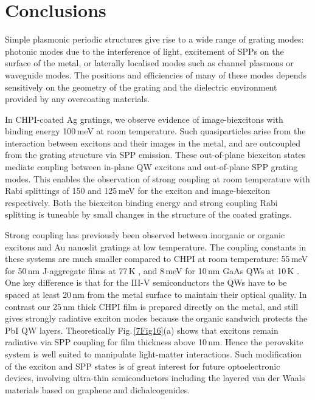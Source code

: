 \section{Conclusions}
Simple plasmonic periodic structures give rise to a wide range of grating modes: photonic modes due to the interference of light, excitement of SPPs on the surface of the metal, or laterally localised modes such as channel plasmons or waveguide modes. The positions and efficiencies of many of these modes depends sensitively on the geometry of the grating and the dielectric environment provided by any overcoating materials.

In CHPI-coated Ag gratings, we observe evidence of image-biexcitons with binding energy 100\,meV at room temperature. Such quasiparticles arise from the interaction between excitons and their images in the metal, and are outcoupled from the grating structure via SPP emission. These out-of-plane biexciton states mediate coupling between in-plane QW excitons and out-of-plane SPP grating modes. This enables the observation of strong coupling at room temperature with Rabi splittings of 150 and 125\,meV for the exciton and image-biexciton respectively. Both the biexciton binding energy and strong coupling Rabi splitting is tuneable by small changes in the structure of the coated gratings.

Strong coupling has previously been observed between inorganic or organic excitons and Au nanoslit gratings at low temperature. The coupling constants in these systems are much smaller compared to CHPI at room temperature: 55\,meV for 50\,nm J-aggregate films at 77\,K \cite{Vasa2010}, and 8\,meV for 10\,nm GaAs QWs at 10\,K \cite{Vasa2008}. One key difference is that for the III-V semiconductors the QWs have to be spaced at least 20\,nm from the metal surface to maintain their optical quality. In contrast our 25\,nm thick CHPI film is prepared directly on the metal, and still gives strongly radiative exciton modes because the organic sandwich protects the PbI QW layers. Theoretically Fig.\,\ref{7Fig16}(a) shows that excitons remain radiative via SPP coupling for film thickness above 10\,nm. Hence the perovskite system is well suited to manipulate light-matter interactions. Such modification of the exciton and SPP states is of great interest for future optoelectronic devices, involving ultra-thin semiconductors including the layered van der Waals materials based on graphene and dichalcogenides.